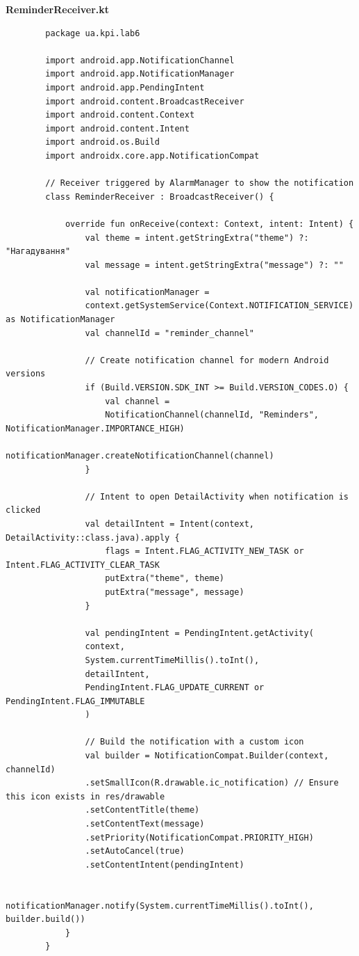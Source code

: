 \documentclass[14pt, a4paper]{extreport}
\begin{document}
	\textbf{ReminderReceiver.kt}
	
	\begin{verbatim} 
		package ua.kpi.lab6
		
		import android.app.NotificationChannel
		import android.app.NotificationManager
		import android.app.PendingIntent
		import android.content.BroadcastReceiver
		import android.content.Context
		import android.content.Intent
		import android.os.Build
		import androidx.core.app.NotificationCompat
		
		// Receiver triggered by AlarmManager to show the notification
		class ReminderReceiver : BroadcastReceiver() {
			
			override fun onReceive(context: Context, intent: Intent) {
				val theme = intent.getStringExtra("theme") ?: "Нагадування"
				val message = intent.getStringExtra("message") ?: ""
				
				val notificationManager =
				context.getSystemService(Context.NOTIFICATION_SERVICE) as NotificationManager
				val channelId = "reminder_channel"
				
				// Create notification channel for modern Android versions
				if (Build.VERSION.SDK_INT >= Build.VERSION_CODES.O) {
					val channel =
					NotificationChannel(channelId, "Reminders", NotificationManager.IMPORTANCE_HIGH)
					notificationManager.createNotificationChannel(channel)
				}
				
				// Intent to open DetailActivity when notification is clicked
				val detailIntent = Intent(context, DetailActivity::class.java).apply {
					flags = Intent.FLAG_ACTIVITY_NEW_TASK or Intent.FLAG_ACTIVITY_CLEAR_TASK
					putExtra("theme", theme)
					putExtra("message", message)
				}
				
				val pendingIntent = PendingIntent.getActivity(
				context,
				System.currentTimeMillis().toInt(),
				detailIntent,
				PendingIntent.FLAG_UPDATE_CURRENT or PendingIntent.FLAG_IMMUTABLE
				)
				
				// Build the notification with a custom icon
				val builder = NotificationCompat.Builder(context, channelId)
				.setSmallIcon(R.drawable.ic_notification) // Ensure this icon exists in res/drawable
				.setContentTitle(theme)
				.setContentText(message)
				.setPriority(NotificationCompat.PRIORITY_HIGH)
				.setAutoCancel(true)
				.setContentIntent(pendingIntent)
				
				notificationManager.notify(System.currentTimeMillis().toInt(), builder.build())
			}
		}
	\end{verbatim}
\end{document}
